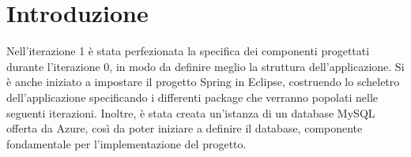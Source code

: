 \section{Introduzione}
Nell'iterazione 1 è stata perfezionata la specifica dei componenti progettati durante l'iterazione 0, in modo da definire meglio la struttura dell'applicazione. Si è anche iniziato a impostare il progetto Spring in Eclipse, costruendo lo scheletro dell'applicazione specificando i differenti package che verranno popolati nelle seguenti iterazioni. Inoltre, è stata creata un'istanza di un database MySQL offerta da Azure, così da poter iniziare a definire il database, componente fondamentale per l'implementazione del progetto.